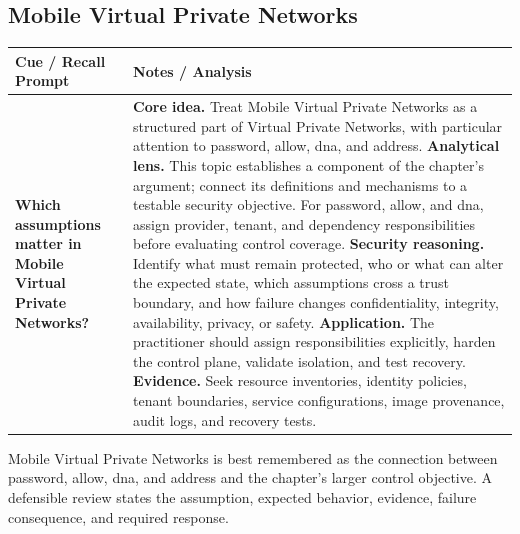 \documentclass[11pt]{article}
\newcommand{\CornellHeader}{%
\rowcolor{Navy}\color{white}\bfseries Cue / Recall Prompt & \color{white}\bfseries Notes / Analysis\\\hline}
\newcommand{\CornellRow}[2]{%
\cellcolor{CueGray}\RaggedRight\textbf{#1} & \RaggedRight #2\\\hline}
\begin{document}
\subsection*{Mobile Virtual Private Networks}
\begin{longtable}{>{\RaggedRight\arraybackslash}p{}|>{\RaggedRight\arraybackslash}p{}}
\CornellHeader
\CornellRow{Which assumptions matter in Mobile Virtual Private Networks?}{\textbf{Core idea.} Treat Mobile Virtual Private Networks as a structured part of Virtual Private Networks, with particular attention to password, allow, dna, and address. \textbf{Analytical lens.} This topic establishes a component of the chapter's argument; connect its definitions and mechanisms to a testable security objective. For password, allow, and dna, assign provider, tenant, and dependency responsibilities before evaluating control coverage. \textbf{Security reasoning.} Identify what must remain protected, who or what can alter the expected state, which assumptions cross a trust boundary, and how failure changes confidentiality, integrity, availability, privacy, or safety. \textbf{Application.} The practitioner should assign responsibilities explicitly, harden the control plane, validate isolation, and test recovery. \textbf{Evidence.} Seek resource inventories, identity policies, tenant boundaries, service configurations, image provenance, audit logs, and recovery tests.}
\end{longtable}
\begin{topicsummary}
Mobile Virtual Private Networks is best remembered as the connection between password, allow, dna, and address and the chapter's larger control objective. A defensible review states the assumption, expected behavior, evidence, failure consequence, and required response.
\end{topicsummary}
\end{document}
